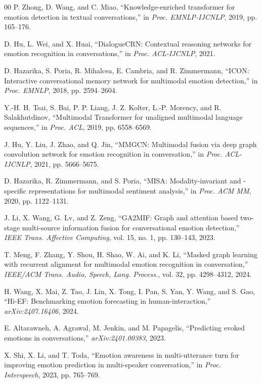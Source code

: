 \documentclass[conference]{IEEEtran}
\begin{document}
\begin{thebibliography}{00}
 P. Zhong, D. Wang, and C. Miao, ``Knowledge-enriched transformer for emotion
detection in textual conversations,'' in \emph{Proc. EMNLP-IJCNLP}, 2019, pp. 165--176.

 D. Hu, L. Wei, and X. Huai, ``DialogueCRN: Contextual reasoning
networks for emotion recognition in conversations,'' in \emph{Proc. ACL-IJCNLP}, 2021.

 D. Hazarika, S. Poria, R. Mihalcea, E. Cambria, and R. Zimmermann,
``ICON: Interactive conversational memory network for multimodal emotion detection,'' in
\emph{Proc. EMNLP}, 2018, pp. 2594--2604.

 Y.-H. H. Tsai, S. Bai, P. P. Liang, J. Z. Kolter, L.-P. Morency, and R.
Salakhutdinov, ``Multimodal Transformer for unaligned multimodal language sequences,'' in
\emph{Proc. ACL}, 2019, pp. 6558--6569.

 J. Hu, Y. Liu, J. Zhao, and Q. Jin, ``MMGCN: Multimodal fusion via deep graph
convolution network for emotion recognition in conversation,'' in \emph{Proc. ACL-IJCNLP}, 2021,
pp. 5666--5675.

 D. Hazarika, R. Zimmermann, and S. Poria, ``MISA: Modality-invariant and
-specific representations for multimodal sentiment analysis,'' in \emph{Proc. ACM MM}, 2020, pp.
1122--1131.

 J. Li, X. Wang, G. Lv, and Z. Zeng, ``GA2MIF: Graph and attention based
two-stage multi-source information fusion for conversational emotion detection,'' \emph{IEEE
Trans. Affective Computing}, vol. 15, no. 1, pp. 130--143, 2023.

 T. Meng, F. Zhang, Y. Shou, H. Shao, W. Ai, and K. Li, ``Masked graph
learning with recurrent alignment for multimodal emotion recognition in conversation,''
\emph{IEEE/ACM Trans. Audio, Speech, Lang. Process.}, vol. 32, pp. 4298--4312, 2024.

 H. Wang, X. Mai, Z. Tao, J. Lin, X. Tong, I. Pan, S. Yan, Y. Wang, and S.
Gao, ``Hi-EF: Benchmarking emotion forecasting in human-interaction,'' \emph{arXiv:2407.16406},
2024.

 E. Altarawneh, A. Agrawal, M. Jenkin, and M. Papagelis, ``Predicting
evoked emotions in conversations,'' \emph{arXiv:2401.00383}, 2023.

 X. Shi, X. Li, and T. Toda, ``Emotion awareness in multi-utterance turn for
improving emotion prediction in multi-speaker conversation,'' in \emph{Proc. Interspeech}, 2023,
pp. 765--769.


\end{thebibliography}
\end{document}
